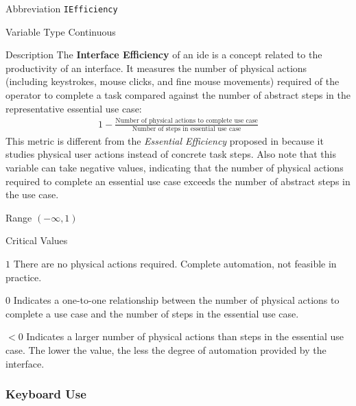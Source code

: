 \begin{AlignedDesc}
  \item[Abbreviation] \texttt{IEfficiency}

  \item[Variable Type] Continuous

  \item[Description] The \textbf{Interface Efficiency} of an \ac{ide} is a
  concept related to the productivity of an interface. It measures the
  number of physical actions (including keystrokes, mouse clicks, and fine
  mouse movements) required of the operator to complete a task compared
  against the number of abstract steps in the representative essential use
  case:
%
  \begin{align*}
    1 - \frac{\text{Number of physical actions to complete use case}}
             {\text{Number of steps in essential use case}}
  \end{align*}
%
  This metric is different from the \textit{Essential Efficiency} proposed
  in \cite{constantine1996} because it studies physical user actions
  instead of concrete task steps. Also note that this variable can take
  negative values, indicating that the number of physical actions required
  to complete an essential use case exceeds the number of abstract steps in
  the use case.

  \item[Range] $(-\infty, 1)$

  \item[Critical Values]
  \begin{AlignedDesc}
    \item[$1$] There are no physical actions required. Complete automation,
    not feasible in practice.
    \item[$0$] Indicates a one-to-one relationship between the number of
    physical actions to complete a use case and the number of steps in the
    essential use case.
    \item[$<0$] Indicates a larger number of physical actions than steps in
    the essential use case. The lower the value, the less the degree of
    automation provided by the interface.
  \end{AlignedDesc}

\end{AlignedDesc}

\subsubsection{Keyboard Use}
\label{subsubsec:keyboard}

